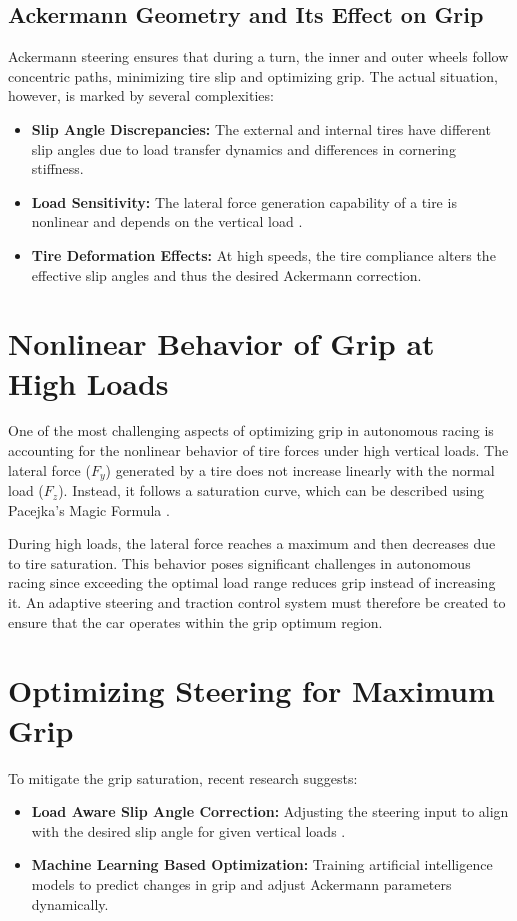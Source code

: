 \documentclass[a4paper,final,12pt]{report}
\begin{document}
\subsection{Ackermann Geometry and Its Effect on Grip}
Ackermann steering ensures that during a turn, the inner and outer wheels follow concentric paths, minimizing tire slip and optimizing grip. The actual situation, however, is marked by several complexities:
\begin{itemize}
    \item \textbf{Slip Angle Discrepancies:} The external and internal tires have different slip angles due to load transfer dynamics and differences in cornering stiffness.
    \item \textbf{Load Sensitivity:} The lateral force generation capability of a tire is nonlinear and depends on the vertical load \cite{Pacejka2012}.
    \item \textbf{Tire Deformation Effects:} At high speeds, the tire compliance alters the effective slip angles and thus the desired Ackermann correction.
\end{itemize}

\section{Nonlinear Behavior of Grip at High Loads}
One of the most challenging aspects of optimizing grip in autonomous racing is accounting for the nonlinear behavior of tire forces under high vertical loads. The lateral force ($F_y$) generated by a tire does not increase linearly with the normal load ($F_z$). Instead, it follows a saturation curve, which can be described using Pacejka’s Magic Formula \cite{Pacejka2012}.

During high loads, the lateral force reaches a maximum and then decreases due to tire saturation. This behavior poses significant challenges in autonomous racing since exceeding the optimal load range reduces grip instead of increasing it. An adaptive steering and traction control system must therefore be created to ensure that the car operates within the grip optimum region.

\section{Optimizing Steering for Maximum Grip}
To mitigate the grip saturation, recent research suggests:
\begin{itemize}
    \item \textbf{Load Aware Slip Angle Correction:} Adjusting the steering input to align with the desired slip angle for given vertical loads \cite{Jambukolam2022}.
    \item \textbf{Machine Learning Based Optimization:} Training artificial intelligence models to predict changes in grip and adjust Ackermann parameters dynamically.
\end{itemize}
\end{document}
